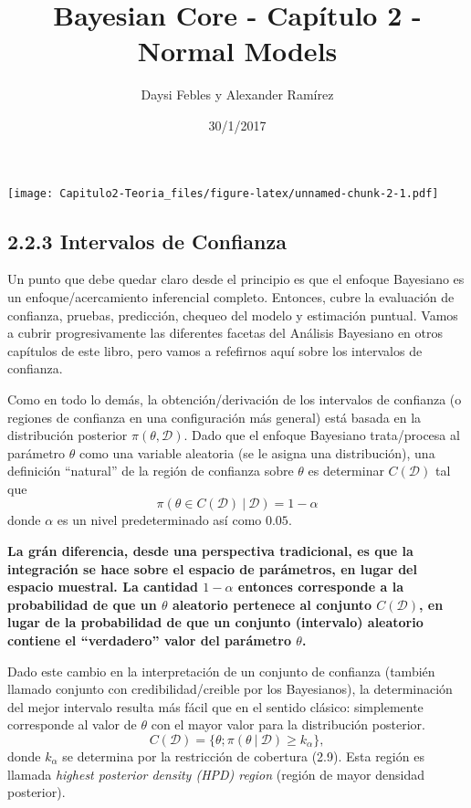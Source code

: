 \documentclass[12pt,]{article}
\title{Bayesian Core - Capítulo 2 - Normal Models}
\author{Daysi Febles y Alexander Ramírez}
\date{30/1/2017}
\begin{document}
\maketitle

{
\setcounter{tocdepth}{4}
\tableofcontents
}
\texttt{[image: Capitulo2-Teoria\_files/figure-latex/unnamed-chunk-2-1.pdf]}

\subsection{2.2.3 Intervalos de
Confianza}\label{intervalos-de-confianza}

Un punto que debe quedar claro desde el principio es que el enfoque
Bayesiano es un enfoque/acercamiento inferencial completo. Entonces,
cubre la evaluación de confianza, pruebas, predicción, chequeo del
modelo y estimación puntual. Vamos a cubrir progresivamente las
diferentes facetas del Análisis Bayesiano en otros capítulos de este
libro, pero vamos a refefirnos aquí sobre los intervalos de confianza.

Como en todo lo demás, la obtención/derivación de los intervalos de
confianza (o regiones de confianza en una configuración más general)
está basada en la distribución posterior \(\pi(\theta,\mathcal{D})\).
Dado que el enfoque Bayesiano trata/procesa al parámetro \(\theta\) como
una variable aleatoria (se le asigna una distribución), una definición
``natural'' de la región de confianza sobre \(\theta\) es determinar
\(C(\mathcal{D})\) tal que \[
\tag{2.9}
\pi(\theta \in C(\mathcal{D})\ |\ \mathcal{D}) = 1 - \alpha
\] donde \(\alpha\) es un nivel predeterminado así como \(0.05\).

\textbf{La grán diferencia, desde una perspectiva tradicional, es que la
integración se hace sobre el espacio de parámetros, en lugar del espacio
muestral. La cantidad \(1-\alpha\) entonces corresponde a la
probabilidad de que un \(\theta\) aleatorio pertenece al conjunto
\(C(\mathcal{D})\), en lugar de la probabilidad de que un conjunto
(intervalo) aleatorio contiene el ``verdadero'' valor del parámetro
\(\theta\).}

Dado este cambio en la interpretación de un conjunto de confianza
(también llamado conjunto con credibilidad/creible por los Bayesianos),
la determinación del mejor intervalo resulta más fácil que en el sentido
clásico: simplemente corresponde al valor de \(\theta\) con el mayor
valor para la distribución posterior. \[
C(\mathcal{D})=\{\theta; \pi(\theta\ |\ \mathcal{D})\ge k_{\alpha}\},
\] donde \(k_\alpha\) se determina por la restricción de cobertura
(2.9). Esta región es llamada \emph{highest posterior density (HPD)
region} (región de mayor densidad posterior).
\end{document}

